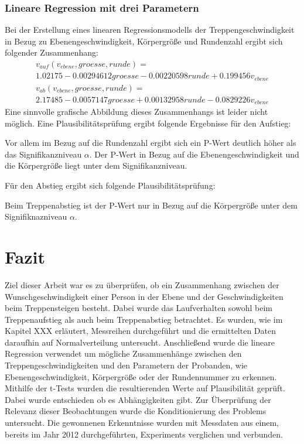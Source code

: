 	
	
	
	
	
	
	
	
	\subsubsection{Lineare Regression mit drei Parametern}
	Bei der Erstellung eines linearen Regressionsmodells der Treppengeschwindigkeit in Bezug zu Ebenengeschwindigkeit, Körpergröße und Rundenzahl ergibt sich folgender Zusammenhang:
	\begin{multline}
		v_{auf}(v_{ebene}, groesse, runde) = \\ 
		1.02175 -0.00294612 groesse -0.00220598 runde +0.199456 v_{ebene}
	\end{multline}
	\begin{multline}
		v_{ab}(v_{ebene}, groesse, runde ) = \\ 
		2.17485 -0.0057147 groesse+0.00132958 runde -0.0829226 v_{ebene}
	\end{multline}
	Eine sinnvolle grafische Abbildung dieses Zusammenhangs ist leider nicht möglich. 
	Eine Plausibilitätsprüfung ergibt folgende Ergebnisse für den Aufstieg:
	
	Vor allem im Bezug auf die Rundenzahl ergibt sich ein P-Wert deutlich höher als das Signifikanzniveau $\alpha$. Der P-Wert in Bezug auf die Ebenengeschwindigkeit und die Körpergröße liegt unter dem Signifikanzniveau.
	
	
	Für den Abstieg ergibt sich folgende Plausibilitätsprüfung:
	
	Beim Treppenabstieg ist der P-Wert nur in Bezug auf die Körpergröße unter dem Signifiknazniveau $\alpha$.
	
	
	\section{Fazit}
	Ziel dieser Arbeit war es zu überprüfen, ob ein Zusammenhang zwischen der Wunschgeschwindigkeit einer Person in der Ebene und der Geschwindigkeiten beim Treppensteigen besteht. Dabei wurde das Laufverhalten sowohl beim Treppenaufstieg als auch beim Treppenabstieg betrachtet. Es wurden, wie im Kapitel XXX erläutert, Messreihen durchgeführt und die ermittelten Daten daraufhin auf Normalverteilung untersucht. Anschließend wurde die lineare Regression verwendet um mögliche Zusammenhänge zwischen den Treppengeschwindigkeiten und den Parametern der Probanden, wie Ebenengeschwindigkeit, Körpergröße oder der Rundennummer zu erkennen. Mithilfe der t-Tests wurden die resultierenden Werte auf Plausibilität geprüft. Dabei wurde entschieden ob es Abhängigkeiten gibt. Zur Überprüfung der Relevanz dieser Beobachtungen wurde die Konditionierung des Problems untersucht. Die gewonnenen Erkenntnisse wurden mit Messdaten aus einem, bereits im Jahr 2012 durchgeführten, Experiments verglichen und verbunden.
	
